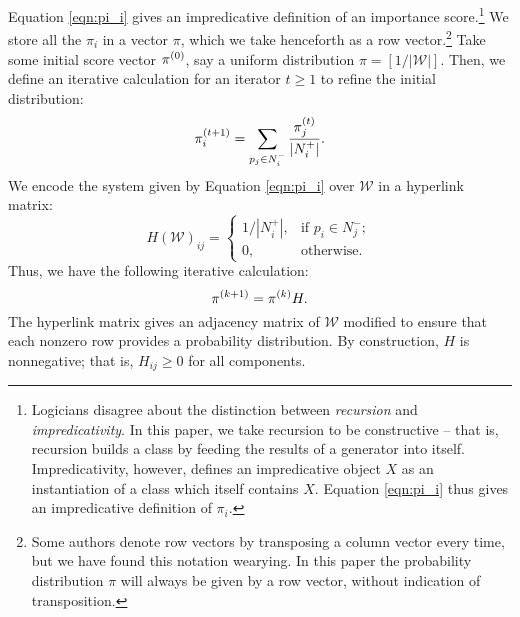 \documentclass[../exploring-pagerank.tex]{subfiles}
\begin{document}
    Equation \eqref{eqn:pi_i} gives an impredicative definition of an importance score.\footnote{Logicians disagree about the distinction between \textit{recursion} and \textit{impredicativity}. In this paper, we take recursion to be constructive -- that is, recursion builds a class by feeding the results of a generator into itself. Impredicativity, however, defines an impredicative object $X$ as an instantiation of a class which itself contains $X$. Equation \eqref{eqn:pi_i} thus gives an impredicative definition of $\pi_i$.} We store all the $\pi_i$ in a vector $\pi$, which we take henceforth as a row vector.\footnote{Some authors denote row vectors by transposing a column vector every time, but we have found this notation wearying. In this paper the probability distribution $\pi$ will always be given by a row vector, without indication of transposition.} Take some initial score vector $\pi^{(0)}$, say a uniform distribution $\pi = [1/|\mathcal{W}|]$. Then, we define an iterative calculation for an iterator $t\geq 1$ to refine the initial distribution:
 	 \begin{equation}
 	    \label{eqn:pi_t}
	 	\pi^{(t+1)}_i = \sum_{p_j\in N^-_i}{\frac{\pi^{(t)}_j}{|N^+_i|}}.
 	\end{equation}
 	We encode the system given by Equation \eqref{eqn:pi_i} over $\mathcal{W}$ in a hyperlink matrix:
 	\begin{equation*}
 		H(\mathcal{W})_{ij}=\begin{cases}
 			1/|N^+_i|, & \text{if } p_i \in N^-_j; \\
 			0, & \text{otherwise}.
 		\end{cases}
 	\end{equation*}
 	Thus, we have the following iterative calculation:
 	\begin{equation}
 	    \pi^{(k+1)} = \pi^{(k)} H.
 	\end{equation}
    The hyperlink matrix gives an adjacency matrix of $\mathcal{W}$ modified to ensure that each nonzero row provides a probability distribution. By construction, $H$ is nonnegative; that is, $H_{ij}\geq 0$ for all components.
\end{document}

